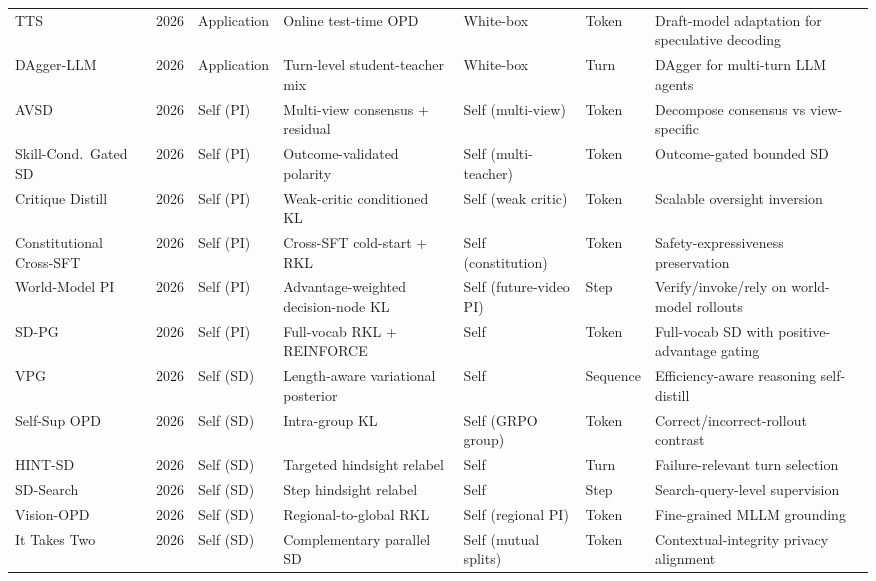 \documentclass{article} %
\begin{document}
\begin{table}[t]
{\begin{tabular}{@{}lclllll@{}}
        TTS~\citep{2605.09329} & 2026 & Application & Online test-time OPD & White-box & Token & Draft-model adaptation for speculative decoding \\
        DAgger-LLM~\citep{2605.12913} & 2026 & Application & Turn-level student-teacher mix & White-box & Turn & DAgger for multi-turn LLM agents \\
        AVSD~\citep{2605.20643} & 2026 & Self (PI) & Multi-view consensus + residual & Self (multi-view) & Token & Decompose consensus vs view-specific \\
        Skill-Cond.\ Gated SD~\citep{2605.28791} & 2026 & Self (PI) & Outcome-validated polarity & Self (multi-teacher) & Token & Outcome-gated bounded SD \\
        Critique Distill~\citep{2606.00424} & 2026 & Self (PI) & Weak-critic conditioned KL & Self (weak critic) & Token & Scalable oversight inversion \\
        Constitutional Cross-SFT~\citep{2606.03089} & 2026 & Self (PI) & Cross-SFT cold-start + RKL & Self (constitution) & Token & Safety-expressiveness preservation \\
        World-Model PI~\citep{2606.03603} & 2026 & Self (PI) & Advantage-weighted decision-node KL & Self (future-video PI) & Step & Verify/invoke/rely on world-model rollouts \\
        SD-PG~\citep{2606.04036} & 2026 & Self (PI) & Full-vocab RKL + REINFORCE & Self & Token & Full-vocab SD with positive-advantage gating \\
        VPG~\citep{2605.11019} & 2026 & Self (SD) & Length-aware variational posterior & Self & Sequence & Efficiency-aware reasoning self-distill \\
        Self-Sup OPD~\citep{2605.17497} & 2026 & Self (SD) & Intra-group KL & Self (GRPO group) & Token & Correct/incorrect-rollout contrast \\
        HINT-SD~\citep{2605.17873} & 2026 & Self (SD) & Targeted hindsight relabel & Self & Turn & Failure-relevant turn selection \\
        SD-Search~\citep{2605.18299} & 2026 & Self (SD) & Step hindsight relabel & Self & Step & Search-query-level supervision \\
        Vision-OPD~\citep{2605.18740} & 2026 & Self (SD) & Regional-to-global RKL & Self (regional PI) & Token & Fine-grained MLLM grounding \\
        It Takes Two~\citep{2605.20258} & 2026 & Self (SD) & Complementary parallel SD & Self (mutual splits) & Token & Contextual-integrity privacy alignment \\

\end{tabular}}
\end{table}
\end{document}

